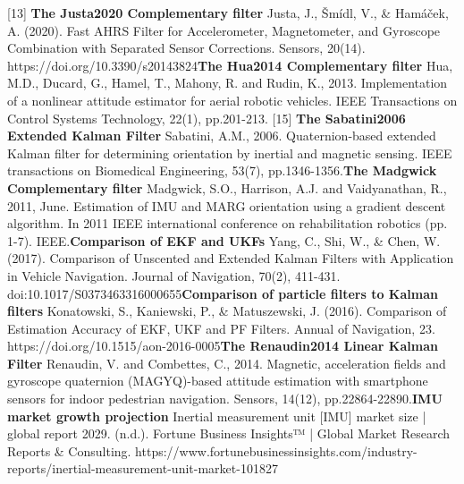 \documentclass[10pt]{report}
\begin{document}
[13] \textbf{The Justa2020 Complementary filter} \newline
Justa, J., Šmídl, V., \& Hamáček, A. (2020). Fast AHRS Filter for Accelerometer, Magnetometer, and Gyroscope Combination with Separated Sensor Corrections. Sensors, 20(14). https://doi.org/10.3390/s20143824\newline
[14] \textbf{The Hua2014 Complementary filter} \newline
Hua, M.D., Ducard, G., Hamel, T., Mahony, R. and Rudin, K., 2013. Implementation of a nonlinear attitude estimator for aerial robotic vehicles. IEEE Transactions on Control Systems Technology, 22(1), pp.201-213.
[15] \textbf{The Sabatini2006 Extended Kalman Filter} \newline
Sabatini, A.M., 2006. Quaternion-based extended Kalman filter for determining orientation by inertial and magnetic sensing. IEEE transactions on Biomedical Engineering, 53(7), pp.1346-1356.\newline
[16] \textbf{The Madgwick Complementary filter}\newline
Madgwick, S.O., Harrison, A.J. and Vaidyanathan, R., 2011, June. Estimation of IMU and MARG orientation using a gradient descent algorithm. In 2011 IEEE international conference on rehabilitation robotics (pp. 1-7). IEEE.\newline
[17] \textbf{Comparison of EKF and UKFs}\newline
Yang, C., Shi, W., \& Chen, W. (2017). Comparison of Unscented and Extended Kalman Filters with Application in Vehicle Navigation. Journal of Navigation, 70(2), 411-431. doi:10.1017/S0373463316000655\newline
[18] \textbf{Comparison of particle filters to Kalman filters}\newline
Konatowski, S., Kaniewski, P., \& Matuszewski, J. (2016). Comparison of Estimation Accuracy of EKF, UKF and PF Filters. Annual of Navigation, 23. https://doi.org/10.1515/aon-2016-0005\newline
[19] \textbf{The Renaudin2014 Linear Kalman Filter}\newline
Renaudin, V. and Combettes, C., 2014. Magnetic, acceleration fields and gyroscope quaternion (MAGYQ)-based attitude estimation with smartphone sensors for indoor pedestrian navigation. Sensors, 14(12), pp.22864-22890.\newline
[20] \textbf{IMU market growth projection}\newline
Inertial measurement unit [IMU] market size | global report 2029. (n.d.). Fortune Business Insights™ | Global Market Research Reports \& Consulting.
https://www.fortunebusinessinsights.com/industry-reports/inertial-measurement-unit-market-101827
\end{document}
